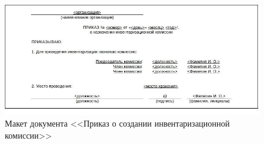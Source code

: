 





\begin{figure}[!h]
    \centering

    \includegraphics[width=17cm]
    {assets/layouts/DOC_PrilazSozdInventKomis.jpg}

    \caption{Макет документа <<Приказ о создании инвентаризационной комиссии>>}

    \label{fig:DOC_PrilazSozdInventKomis}
\end{figure}

